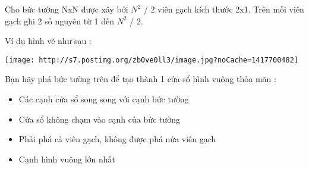 Cho bức tường NxN được xây bởi $N^{2}$ / 2 viên gạch kích thước 2x1. Trên mỗi viên gạch ghi 2 số nguyên từ 1 đến $N^{2}$ / 2.

Ví dụ hình vẽ như sau :


\texttt{[image: http://s7.postimg.org/zb0ve0ll3/image.jpg?noCache=1417700482]}

Bạn hãy phá bức tường trên để tạo thành 1 cửa sổ hình vuông thỏa mãn :
\begin{itemize}
	\item Các cạnh cửa sổ song song với cạnh bức tường
	\item Cửa sổ không chạm vào cạnh của bức tường
	\item Phải phá cả viên gạch, không được phá nửa viên gạch
	\item Cạnh hình vuông lớn nhất
\end{itemize}